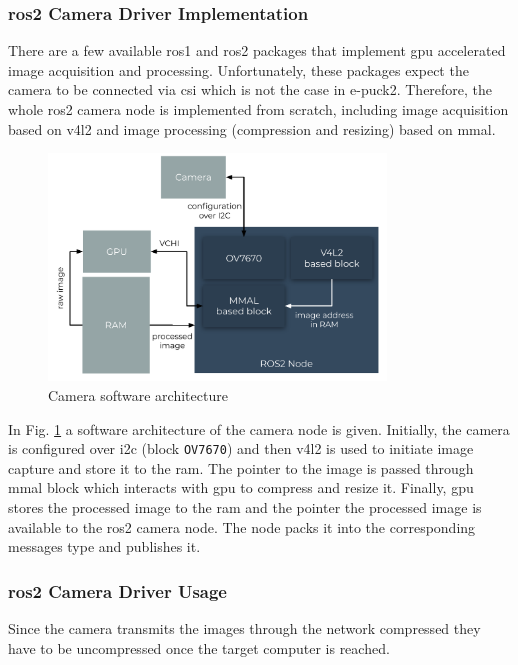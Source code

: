 \subsubsection{\ac{ros2} Camera Driver Implementation}
There are a few available \ac{ros}1 and \ac{ros2} packages that implement \ac{gpu} accelerated image acquisition and processing.
Unfortunately, these packages expect the camera to be connected via \ac{csi} which is not the case in e-puck2. 
Therefore, the whole \ac{ros2} camera node is implemented from scratch, including image acquisition based on \ac{v4l2} and image processing (compression and resizing) based on \ac{mmal}.
 
 \begin{figure}[H]
    \centering
    \includegraphics[width=0.8\textwidth]{physical/figures/camera_software_architecture.pdf}
    \caption{Camera software architecture}
    \label{fig:physical:camera_software_architecture}
\end{figure}
 
 In Fig. \ref{fig:physical:camera_software_architecture} a software architecture of the camera node is given. 
 Initially, the camera is configured over \ac{i2c} (block \texttt{OV7670}) and then \ac{v4l2} is used to initiate image capture and store it to the \ac{ram}.
 The pointer to the image is passed through \ac{mmal} block which interacts with \ac{gpu} to compress and resize it. 
 Finally, \ac{gpu} stores the processed image to the \ac{ram} and the pointer the processed image is available to the \ac{ros2} camera node.
 The node packs it into the corresponding messages type and publishes it.
 
 \subsubsection{\ac{ros2} Camera Driver Usage}
 Since the camera transmits the images through the network compressed they have to be uncompressed once the target computer is reached.
 
